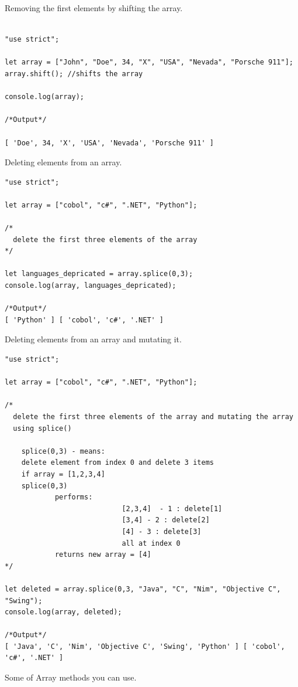 \documentclass[10pt, a4paper, twocolumn]{article}
\begin{document}
Removing the first elements by shifting the array.

\begin{lstlisting}

"use strict";

let array = ["John", "Doe", 34, "X", "USA", "Nevada", "Porsche 911"];
array.shift(); //shifts the array

console.log(array);

/*Output*/

[ 'Doe', 34, 'X', 'USA', 'Nevada', 'Porsche 911' ]

\end{lstlisting}

Deleting elements from an array.

\begin{lstlisting}
"use strict";

let array = ["cobol", "c#", ".NET", "Python"];

/*
  delete the first three elements of the array
*/

let languages_depricated = array.splice(0,3);
console.log(array, languages_depricated);

/*Output*/
[ 'Python' ] [ 'cobol', 'c#', '.NET' ]
\end{lstlisting}

Deleting elements from an array and mutating it.

\begin{lstlisting}
"use strict";

let array = ["cobol", "c#", ".NET", "Python"];

/*
  delete the first three elements of the array and mutating the array
  using splice()

	splice(0,3) - means:
	delete element from index 0 and delete 3 items
	if array = [1,2,3,4]
	splice(0,3)
			performs:
							[2,3,4]  - 1 : delete[1]
							[3,4] - 2 : delete[2]
							[4] - 3 : delete[3]
							all at index 0
			returns new array = [4]
*/

let deleted = array.splice(0,3, "Java", "C", "Nim", "Objective C", "Swing");
console.log(array, deleted);

/*Output*/
[ 'Java', 'C', 'Nim', 'Objective C', 'Swing', 'Python' ] [ 'cobol', 'c#', '.NET' ]
\end{lstlisting}

Some of Array methods you can use.
\end{document}
